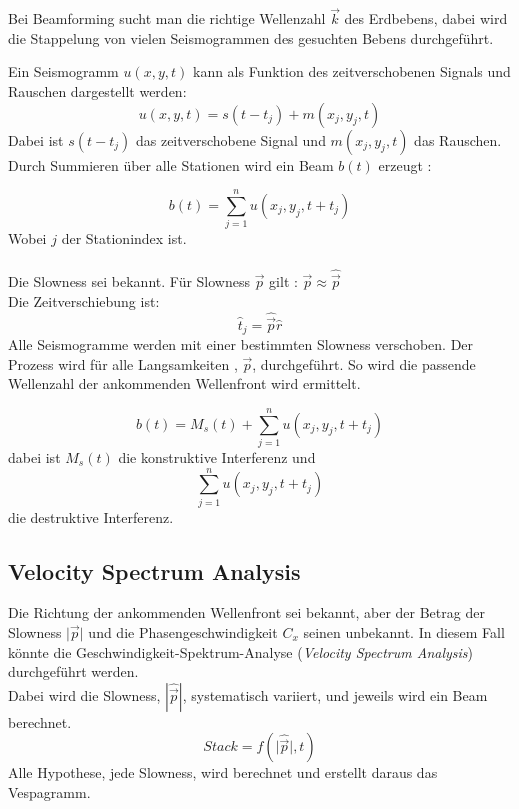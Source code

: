 Bei Beamforming sucht man die richtige Wellenzahl $\vec{k}$ des Erdbebens, dabei wird die Stappelung von vielen Seismogrammen des gesuchten Bebens durchgeführt. 

Ein Seismogramm $u(x,y,t)$ kann als Funktion des zeitverschobenen Signals und Rauschen dargestellt werden:
\begin{equation}
u(x,y,t) = s(t-t_{j})+m(x_{j},y_{j},t)
\end{equation}
 Dabei ist $s(t-t_{j})$ das zeitverschobene Signal und $m(x_{j},y_{j},t)$ das Rauschen.\\
 Durch Summieren über alle Stationen wird ein Beam $b(t)$ erzeugt :
 
\begin{equation}
 b(t) = \sum_{j=1}^{n} u( x_{j},y_{j},t+t_{j})
\end{equation}
{\small Wobei $j$ der Stationindex ist.}\\\\ 
 Die Slowness sei bekannt. Für Slowness $\vec{p}$ gilt : $ \vec{p}\approx \hat{\vec{p}}$\\
 Die Zeitverschiebung ist: 
 \begin{equation}
 \hat{t}_{j}=\hat{\vec{p}}\hat{r}
 \end{equation}
Alle Seismogramme werden mit einer bestimmten Slowness verschoben. Der Prozess wird für alle Langsamkeiten , $\vec{p}$, durchgeführt. So wird die passende Wellenzahl der ankommenden Wellenfront wird ermittelt. 
 

 \begin{equation}
 b(t) = M_{s}(t)+ \sum_{j=1}^{n} u( x_{j},y_{j},t+t_{j})
 \end{equation}
 dabei ist $M_{s}(t)$ die konstruktive Interferenz und
\[
\sum_{j=1}^{n} u( x_{j},y_{j},t+t_{j})
\]
die destruktive Interferenz.

\subsection{Velocity Spectrum Analysis}
Die Richtung der ankommenden Wellenfront sei bekannt, aber der Betrag der Slowness  $\vert\vec{p}\vert$ und die Phasengeschwindigkeit $C_{x}$ seinen unbekannt.
In diesem Fall könnte die Geschwindigkeit-Spektrum-Analyse (\textit{Velocity Spectrum Analysis}) durchgeführt werden.\\
Dabei wird die Slowness, $|\hat{\vec{p}}|$, systematisch variiert, und jeweils wird ein Beam berechnet.
\[
Stack = f(\vert\hat{\vec{p}}\vert,t)
\]
Alle Hypothese, jede Slowness, wird berechnet und erstellt daraus das Vespagramm. 

